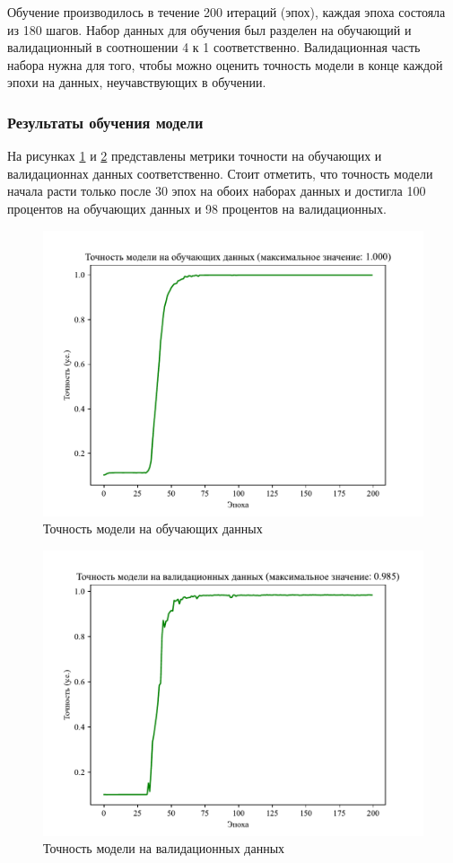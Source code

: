 Обучение производилось в течение 200 итераций (эпох), каждая эпоха состояла из 180 шагов. Набор данных для обучения был разделен на обучающий и валидационный в соотношении 4 к 1 соответственно. Валидационная часть набора нужна для того, чтобы можно оценить точность модели в конце каждой эпохи на данных, неучавствующих в обучении.

\subsubsection{Результаты обучения модели}
На рисунках \ref{fig:train_acc} и \ref{fig:val_acc} представлены метрики точности на обучающих и валидационнах данных соответственно. Стоит отметить, что точность модели начала расти только после 30 эпох на обоих наборах данных и достигла 100 процентов на обучающих данных и 98 процентов на валидационных.
\begin{figure}[H]
	\centering
	\includegraphics[scale=0.8]{img/train_accuracy.pdf}
	\caption{Точность модели на обучающих данных}
	\label{fig:train_acc}
\end{figure}

\begin{figure}[H]
	\centering
	\includegraphics[scale=0.9]{img/val_accuracy.pdf}
	\caption{Точность модели на валидационных данных}
	\label{fig:val_acc}
\end{figure}

